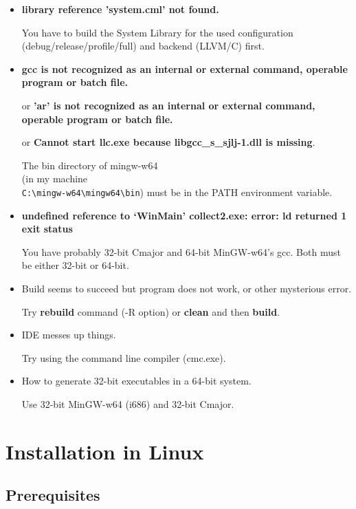 \documentclass[oneside, a4paper, 11pt]{article}
\begin{document}
\begin{itemize}

\item
\textbf{library reference 'system.cml' not found.}

You have to build the System Library for the used configuration (debug/release/profile/full) and backend (LLVM/C) first.

\item

\textbf{gcc is not recognized as an internal or external command, operable program or batch file.}

or \textbf{'ar' is not recognized as an internal or external command, operable program or batch file.}

or \textbf{Cannot start llc.exe because libgcc\_s\_sjlj-1.dll is missing}.

The bin directory of mingw-w64\\
(in my machine\\
\verb|C:\mingw-w64\mingw64\bin|)
must be in the PATH environment variable.

\item
\textbf{undefined reference to `WinMain' collect2.exe: error: ld returned 1 exit status}

You have probably 32-bit Cmajor and 64-bit MinGW-w64's gcc.
Both must be either 32-bit or 64-bit.

\item
Build seems to succeed but program does not work, or other mysterious error.

Try \textbf{rebuild} command (-R option) or \textbf{clean} and then \textbf{build}.

\item
IDE messes up things.

Try using the command line compiler (cmc.exe).

\item
How to generate 32-bit executables in a 64-bit system.

Use 32-bit MinGW-w64 (i686) and 32-bit Cmajor.
\end{itemize}

\section{Installation in Linux}

\subsection{Prerequisites}
\end{document}

